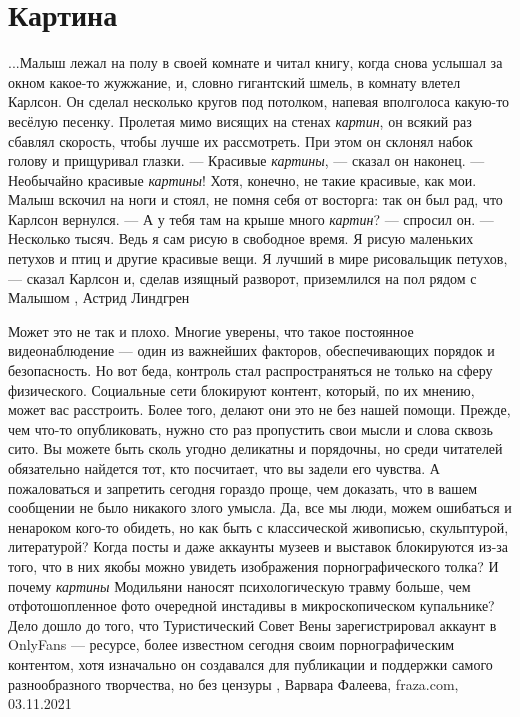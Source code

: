  
 
 
 
 
\chapter{Картина}
\label{sec:slova.kartina}

...Малыш лежал на полу в своей комнате и читал книгу, когда снова услышал за
окном какое-то жужжание, и, словно гигантский шмель, в комнату влетел Карлсон.
Он сделал несколько кругов под потолком, напевая вполголоса какую-то весёлую
песенку. Пролетая мимо висящих на стенах \emph{картин}, он всякий раз сбавлял
скорость, чтобы лучше их рассмотреть. При этом он склонял набок голову и
прищуривал глазки.  — Красивые \emph{картины}, — сказал он наконец. — Необычайно
красивые \emph{картины}! Хотя, конечно, не такие красивые, как мои.  Малыш вскочил на
ноги и стоял, не помня себя от восторга: так он был рад, что Карлсон вернулся.
— А у тебя там на крыше много \emph{картин}? — спросил он.  — Несколько тысяч. Ведь я
сам рисую в свободное время. Я рисую маленьких петухов и птиц и другие красивые
вещи. Я лучший в мире рисовальщик петухов, — сказал Карлсон и, сделав изящный
разворот, приземлился на пол рядом с Малышом
, Астрид Линдгрен

Может это не так и плохо. Многие уверены, что такое постоянное видеонаблюдение
— один из важнейших факторов, обеспечивающих порядок и безопасность.  Но вот
беда, контроль стал распространяться не только на сферу физического.
Социальные сети блокируют контент, который, по их мнению, может вас расстроить.
Более того, делают они это не без нашей помощи. Прежде, чем что-то
опубликовать, нужно сто раз пропустить свои мысли и слова сквозь сито. Вы
можете быть сколь угодно деликатны и порядочны, но среди читателей обязательно
найдется тот, кто посчитает, что вы задели его чувства. А пожаловаться и
запретить сегодня гораздо проще, чем доказать, что в вашем сообщении не было
никакого злого умысла.  Да, все мы люди, можем ошибаться и ненароком кого-то
обидеть, но как быть с классической живописью, скульптурой, литературой? Когда
посты и даже аккаунты музеев и выставок блокируются из-за того, что в них якобы
можно увидеть изображения порнографического толка? И почему \emph{картины}
Модильяни наносят психологическую травму больше, чем отфотошопленное фото
очередной инстадивы в микроскопическом купальнике? Дело дошло до того, что
Туристический Совет Вены зарегистрировал аккаунт в OnlyFans — ресурсе, более
известном сегодня своим порнографическим контентом, хотя изначально он
создавался для публикации и поддержки самого разнообразного творчества, но без
цензуры
, 
Варвара Фалеева, fraza.com, 03.11.2021

